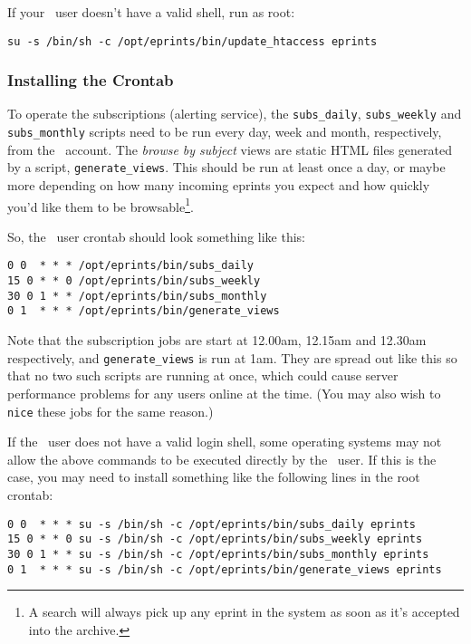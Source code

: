 If your \eprints\ user doesn't have a valid shell, run as root:

\begin{verbatim}
su -s /bin/sh -c /opt/eprints/bin/update_htaccess eprints
\end{verbatim}


\subsubsection{Installing the Crontab}
\label{manual_crontab}

To operate the subscriptions (alerting service), the {\tt subs\_daily}, {\tt subs\_weekly} and {\tt subs\_monthly} scripts need to be run every day, week and month, respectively, from the \eprints\ account. The \emph{browse by subject} views are static HTML files generated by a script, {\tt generate\_views}. This should be run at least once a day, or maybe more depending on how many incoming eprints you expect and how quickly you'd like them to be browsable\footnote{A search will always pick up any eprint in the system as soon as it's accepted into the archive.}.

So, the \eprints\ user crontab should look something like this:

\begin{verbatim}
0 0  * * * /opt/eprints/bin/subs_daily
15 0 * * 0 /opt/eprints/bin/subs_weekly
30 0 1 * * /opt/eprints/bin/subs_monthly
0 1  * * * /opt/eprints/bin/generate_views
\end{verbatim}

Note that the subscription jobs are start at 12.00am, 12.15am and 12.30am respectively, and {\tt generate\_views} is run at 1am. They are spread out like this so that no two such scripts are running at once, which could cause server performance problems for any users online at the time. (You may also wish to {\tt nice} these jobs for the same reason.)

If the \eprints\ user does not have a valid login shell, some operating systems may not allow the above commands to be executed directly by the \eprints\ user. If this is the case, you may need to install something like the following lines in the root crontab:

\begin{verbatim}
0 0  * * * su -s /bin/sh -c /opt/eprints/bin/subs_daily eprints
15 0 * * 0 su -s /bin/sh -c /opt/eprints/bin/subs_weekly eprints
30 0 1 * * su -s /bin/sh -c /opt/eprints/bin/subs_monthly eprints
0 1  * * * su -s /bin/sh -c /opt/eprints/bin/generate_views eprints
\end{verbatim}


